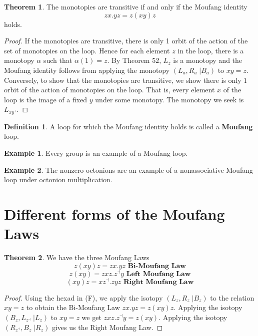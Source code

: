 \documentclass[11pt]{report}
\theoremstyle{plain}
\theoremstyle{definition}
\newtheorem{defn}{Definition}
\newtheorem{exmp}{Example} %
\newtheorem{theorem}{Theorem}
\begin{document}
\begin{theorem}
	The monotopies are transitive if and only if the Moufang identity 
	$$zx.yz = z(xy)z $$ holds.
\end{theorem}
\begin{proof}
	If the monotopies are transitive, there is only 1 orbit of the action of the set of monotopies on the loop. Hence for each element $ z $ in the loop, there is a monotopy $ \alpha $ such that $ \alpha(1) = z. $ By Theorem 52, $ L_z $ is a monotopy and the Moufang identity follows from applying the monotopy $ (L_a, R_a \;| B_a) \text{ to } xy =z$. Conversely, to show that the monotopies are transitive, we show there is only $ 1 $  orbit of the action of monotopies on the loop. That is, every element $ x $ of the loop is the image of a fixed $ y $ under some monotopy. The monotopy we seek is $ L_{xy^\dashv}.  $
\end{proof}
\begin{defn}
A loop for which the Moufang identity holds is called a \textbf{Moufang} loop.
\end{defn}
\begin{exmp}
Every group is an example of a Moufang loop.
\end{exmp}
\begin{exmp}
The nonzero octonions are an example of a nonassociative Moufang loop under octonion multiplication.
\end{exmp}
\section{Different forms of the Moufang Laws}

\begin{theorem}
	We have the three Moufang Laws 
	$$z(xy)z = zx.yz \textbf{ Bi-Moufang Law} $$
	$$z(xy) = zxz.z^\dashv y \textbf{ Left Moufang Law}$$
	$$(xy)z = xz^\dashv .zyz \textbf{ Right Moufang Law}$$
\end{theorem}
\begin{proof}
Using the hexad in (F), we apply the isotopy $ (L_z, R_z \;| B_z) $ to the relation $ xy=z $ to obtain the Bi-Moufang Law $ zx.yz = z(xy)z $. Applying the isotopy $ (B_z, L_{z^\dashv} \; | L_z) $ to $ xy=z $ we get $ zxz.z^\dashv y = z(xy) $. Applying the isotopy $ (R_{z^\dashv}, B_z \; | R_z) $ gives us the Right Moufang Law.
\end{proof}

\hrulefill


	
	
	
	
	
	
	
	
	
	
	
	
	

	
\end{document}
